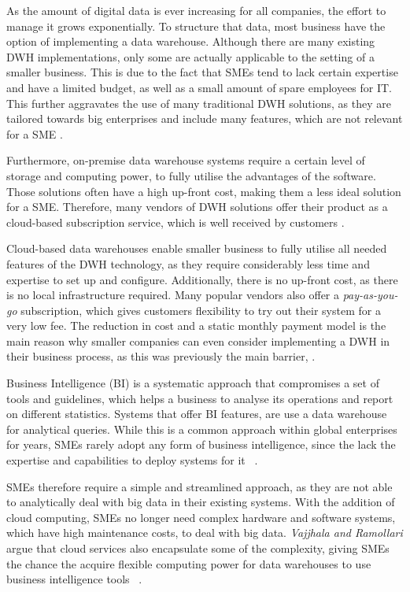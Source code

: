 \documentclass[../paper.tex]{subfiles}
\begin{document}
As the amount of digital data is ever increasing for all companies, the effort to manage it grows exponentially. To structure that data, most business have the option of implementing a data warehouse. Although there are many existing DWH implementations, only some are actually applicable to the setting of a smaller business. This is due to the fact that SMEs tend to lack certain expertise and have a limited budget, as well as a small amount of spare employees for IT. This further aggravates the use of many traditional DWH solutions, as they are tailored towards big enterprises and include many features, which are not relevant for a SME \cite{Raj2016}.

Furthermore, on-premise data warehouse systems require a certain level of storage and computing power, to fully utilise the advantages of the software. Those solutions often have a high up-front cost, making them a less ideal solution for a SME. Therefore, many vendors of DWH solutions offer their product as a cloud-based subscription service, which is well received by customers \cite{Agostino2013}.

Cloud-based data warehouses enable smaller business to fully utilise all needed features of the DWH technology, as they require considerably less time and expertise to set up and configure. Additionally, there is no up-front cost, as there is no local infrastructure required. Many popular vendors also offer a \textit{pay-as-you-go} subscription, which gives customers flexibility to try out their system for a very low fee. The reduction in cost and a static monthly payment model is the main reason why smaller companies can even consider implementing a DWH in their business process, as this was previously the main barrier, \cite{Fernandes2016}.

Business Intelligence (BI) is a systematic approach that compromises a set of tools and guidelines, which helps a business to analyse its operations and report on different statistics. Systems that offer BI features, are use a data warehouse for analytical queries. While this is a common approach within global enterprises for years, SMEs rarely adopt any form of business intelligence, since the lack the expertise and capabilities to deploy systems for it ~\cite{Golfarelli2004}.

SMEs therefore require a simple and streamlined approach, as they are not able to analytically deal with big data in their existing systems. With the addition of cloud computing, SMEs no longer need complex hardware and software systems, which have high maintenance costs, to deal with big data. \textit{Vajjhala and Ramollari} argue that cloud services also encapsulate some of the complexity, giving SMEs the chance the acquire flexible computing power for data warehouses to use business intelligence tools ~\cite{Vajjhala2016}.
\end{document}
